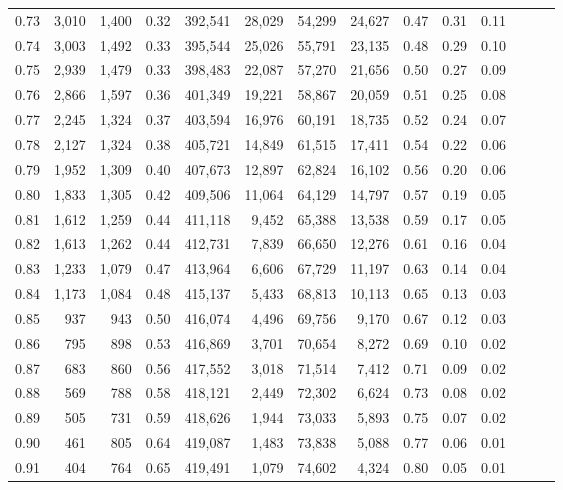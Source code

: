 \begin{tabular}{rrrrrrrrrrrrrr}
0.73 &  3,010 &  1,400 &  0.32 &  392,541 &   28,029 &  54,299 &  24,627 &  0.47 &  0.31 &      0.11 \\
0.74 &  3,003 &  1,492 &  0.33 &  395,544 &   25,026 &  55,791 &  23,135 &  0.48 &  0.29 &      0.10 \\
0.75 &  2,939 &  1,479 &  0.33 &  398,483 &   22,087 &  57,270 &  21,656 &  0.50 &  0.27 &      0.09 \\
0.76 &  2,866 &  1,597 &  0.36 &  401,349 &   19,221 &  58,867 &  20,059 &  0.51 &  0.25 &      0.08 \\
0.77 &  2,245 &  1,324 &  0.37 &  403,594 &   16,976 &  60,191 &  18,735 &  0.52 &  0.24 &      0.07 \\
0.78 &  2,127 &  1,324 &  0.38 &  405,721 &   14,849 &  61,515 &  17,411 &  0.54 &  0.22 &      0.06 \\
0.79 &  1,952 &  1,309 &  0.40 &  407,673 &   12,897 &  62,824 &  16,102 &  0.56 &  0.20 &      0.06 \\
0.80 &  1,833 &  1,305 &  0.42 &  409,506 &   11,064 &  64,129 &  14,797 &  0.57 &  0.19 &      0.05 \\
0.81 &  1,612 &  1,259 &  0.44 &  411,118 &    9,452 &  65,388 &  13,538 &  0.59 &  0.17 &      0.05 \\
0.82 &  1,613 &  1,262 &  0.44 &  412,731 &    7,839 &  66,650 &  12,276 &  0.61 &  0.16 &      0.04 \\
0.83 &  1,233 &  1,079 &  0.47 &  413,964 &    6,606 &  67,729 &  11,197 &  0.63 &  0.14 &      0.04 \\
0.84 &  1,173 &  1,084 &  0.48 &  415,137 &    5,433 &  68,813 &  10,113 &  0.65 &  0.13 &      0.03 \\
0.85 &    937 &    943 &  0.50 &  416,074 &    4,496 &  69,756 &   9,170 &  0.67 &  0.12 &      0.03 \\
0.86 &    795 &    898 &  0.53 &  416,869 &    3,701 &  70,654 &   8,272 &  0.69 &  0.10 &      0.02 \\
0.87 &    683 &    860 &  0.56 &  417,552 &    3,018 &  71,514 &   7,412 &  0.71 &  0.09 &      0.02 \\
0.88 &    569 &    788 &  0.58 &  418,121 &    2,449 &  72,302 &   6,624 &  0.73 &  0.08 &      0.02 \\
0.89 &    505 &    731 &  0.59 &  418,626 &    1,944 &  73,033 &   5,893 &  0.75 &  0.07 &      0.02 \\
0.90 &    461 &    805 &  0.64 &  419,087 &    1,483 &  73,838 &   5,088 &  0.77 &  0.06 &      0.01 \\
0.91 &    404 &    764 &  0.65 &  419,491 &    1,079 &  74,602 &   4,324 &  0.80 &  0.05 &      0.01 \\

\end{tabular}
